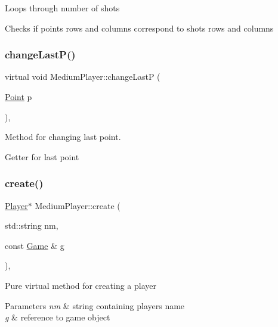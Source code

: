 Loops through number of shots

Checks if point\textquotesingle{}s rows and columns correspond to shot\textquotesingle{}s rows and columns \mbox{\label{class_medium_player_afc952f7dac91d979743154c021d8dee8}} 
\subsubsection{\texorpdfstring{change\+Last\+P()}{changeLastP()}}
{\footnotesize\ttfamily virtual void Medium\+Player\+::change\+LastP (\begin{DoxyParamCaption}\item[{\mbox{\hyperlink{class_point}{Point}}}]{p }\end{DoxyParamCaption})\hspace{0.3cm}{\ttfamily [inline]}, {\ttfamily [virtual]}}



Method for changing last point. 

Getter for last point \mbox{\label{class_medium_player_a6a51f6bab42f57e8af235f2ab196d74e}} 
\subsubsection{\texorpdfstring{create()}{create()}}
{\footnotesize\ttfamily \mbox{\hyperlink{class_player}{Player}}$\ast$ Medium\+Player\+::create (\begin{DoxyParamCaption}\item[{std\+::string}]{nm,  }\item[{const \mbox{\hyperlink{class_game}{Game}} \&}]{g }\end{DoxyParamCaption})\hspace{0.3cm}{\ttfamily [inline]}, {\ttfamily [virtual]}}

Pure virtual method for creating a player 
\begin{DoxyParams}{Parameters}
{\em nm} & string containing player\textquotesingle{}s name \\
\hline
{\em g} & reference to game object \\
\hline
\end{DoxyParams}


